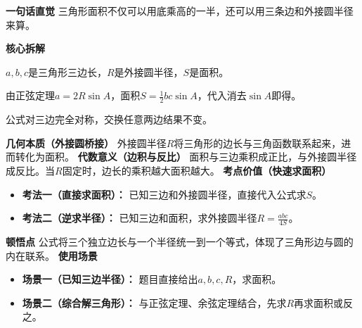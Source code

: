 \begin{explanationbox}
	\textbf{\textcolor{CExplanation}{一句话直觉}}
	三角形面积不仅可以用底乘高的一半，还可以用三条边和外接圆半径来算。

	\medskip
	\textbf{\textcolor{CExplanation}{核心拆解}}
	\begin{description}[style=nextline, leftmargin=2.8em, labelsep=0.5em, itemsep=0.45em]
		\item[\textbf{要点一（变量含义）：}] $a,b,c$是三角形三边长，$R$是外接圆半径，$S$是面积。
		\item[\textbf{要点二（公式推导）：}] 由正弦定理$a=2R\sin A$，面积$S=\frac12 bc\sin A$，代入消去$\sin A$即得。
		\item[\textbf{要点三（对称性）：}] 公式对三边完全对称，交换任意两边结果不变。
	\end{description}
	\medskip
	\textbf{\textcolor{CExplanation}{几何本质（外接圆桥接）}}
	外接圆半径$R$将三角形的边长与三角函数联系起来，进而转化为面积。
	\medskip
	\textbf{\textcolor{CExplanation}{代数意义（边积与反比）}}
	面积与三边乘积成正比，与外接圆半径成反比。当$R$固定时，边长的乘积越大面积越大。
	\medskip
	\textbf{\textcolor{CExplanation}{考点价值（快速求面积）}}
	\begin{itemize}[leftmargin=*, itemsep=0.5em, topsep=0.4em]
		\item \textbf{考法一（直接求面积）：} 已知三边和外接圆半径，直接代入公式求$S$。
		\item \textbf{考法二（逆求半径）：} 已知三边和面积，求外接圆半径$R=\frac{abc}{4S}$。
	\end{itemize}
	\medskip
	\textbf{\textcolor{CExplanation}{顿悟点}}
	公式将三个独立边长与一个半径统一到一个等式，体现了三角形边与圆的内在联系。
	\medskip
	\textbf{\textcolor{CExplanation}{使用场景}}
	\begin{itemize}[leftmargin=*, itemsep=0.5em, topsep=0.4em]
		\item \textbf{场景一（已知三边半径）：} 题目直接给出$a,b,c,R$，求面积。
		\item \textbf{场景二（综合解三角形）：} 与正弦定理、余弦定理结合，先求$R$再求面积或反之。
	\end{itemize}
\end{explanationbox}
